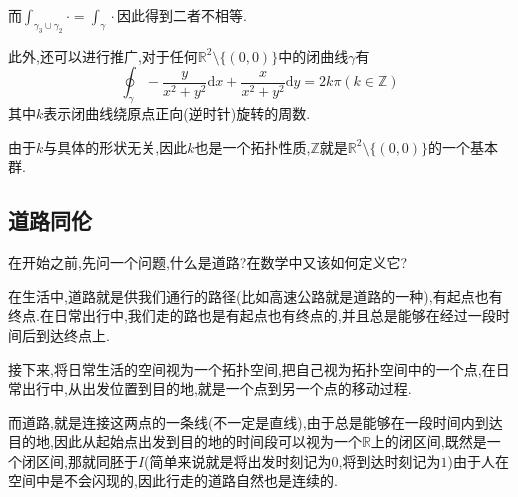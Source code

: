 \documentclass{article}
\begin{document}
而$\int_{\gamma_3 \cup \gamma_2} \cdot = \int_\gamma\cdot$因此得到二者不相等.


此外,还可以进行推广,对于任何$\mathbb{R}^2 \setminus\{(0,0)\}$中的闭曲线$\gamma$有
$$
\oint_{\gamma} -\frac{y}{x^2+y^2}\text{d}x + \frac{x}{x^2+y^2}\text{d}y = 2k\pi(k \in \mathbb{Z})
$$
其中$k$表示闭曲线绕原点正向(逆时针)旋转的周数.


由于$k$与具体的形状无关,因此$k$也是一个拓扑性质,$\mathbb{Z}$就是$\mathbb{R}^2 \setminus\{(0,0)\}$的一个基本群.
\subsection{道路同伦}
在开始之前,先问一个问题,什么是道路?在数学中又该如何定义它?


在生活中,道路就是供我们通行的路径(比如高速公路就是道路的一种),有起点也有终点.在日常出行中,我们走的路也是有起点也有终点的,并且总是能够在经过一段时间后到达终点上.


接下来,将日常生活的空间视为一个拓扑空间,把自己视为拓扑空间中的一个点,在日常出行中,从出发位置到目的地,就是一个点到另一个点的移动过程.


而道路,就是连接这两点的一条线(不一定是直线),由于总是能够在一段时间内到达目的地,因此从起始点出发到目的地的时间段可以视为一个$\mathbb{R}$上的闭区间,既然是一个闭区间,那就同胚于$I$(简单来说就是将出发时刻记为$0$,将到达时刻记为$1$)由于人在空间中是不会闪现的,因此行走的道路自然也是连续的.
\end{document}
